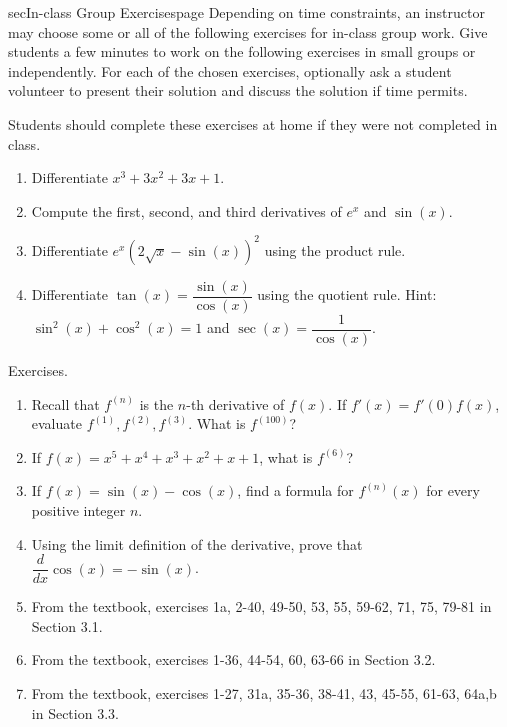\documentclass[../main]{subfiles}
\begin{document}
\begin{outline}{sec}{In-class Group Exercises}{page} \label{act:worksheet}
  Depending on time constraints, an instructor may choose some or all of the following exercises for in-class group work. Give students a few minutes to work on the following exercises in small groups or independently. For each of the chosen exercises, optionally ask a student volunteer to present their solution and discuss the solution if time permits. 

  Students should complete these exercises at home if they were not completed in class.

  \begin{enumerate}
    \item Differentiate \(x^{3} + 3x^{2} + 3x + 1\).
    \item Compute the first, second, and third derivatives of \(e^{x}\) and \(\sin(x)\).
    \item Differentiate \(e^{x} (2\sqrt{x} - \sin(x))^{2}\) using the product rule.
    \item Differentiate \(\tan(x) = \dfrac{\sin(x)}{\cos(x)}\) using the quotient rule.  Hint: \(\sin^{2}(x) + \cos^{2}(x) = 1\) and \(\sec(x) = \dfrac{1}{\cos(x)}\).
  \end{enumerate}

\end{outline}


%
%
Exercises.
\begin{enumerate}
\item Recall that \(f^{(n)}\) is the \(n\)-th derivative of \(f(x)\). If \(f'(x) = f'(0)f(x)\), evaluate \(f^{(1)}, f^{(2)}, f^{(3)}\). What is \(f^{(100)}\)?
\item If \(f(x) = x^{5} + x^{4} + x^{3} + x^{2} + x + 1\), what is \(f^{(6)}\)?
\item If \(f(x) = \sin(x) - \cos(x)\), find a formula for \(f^{(n)}(x)\) for every positive integer \(n\).
\item Using the limit definition of the derivative, prove that \(\dfrac{d}{dx} \cos(x) = -\sin(x)\).
\item From the textbook, exercises 1a,  2-40, 49-50, 53, 55, 59-62, 71, 75, 79-81 in Section 3.1.
\item From the textbook, exercises  1-36, 44-54, 60, 63-66 in Section 3.2.
\item From the textbook, exercises 1-27, 31a, 35-36, 38-41, 43, 45-55, 61-63, 64a,b in Section 3.3.
\end{enumerate}
\end{document}
